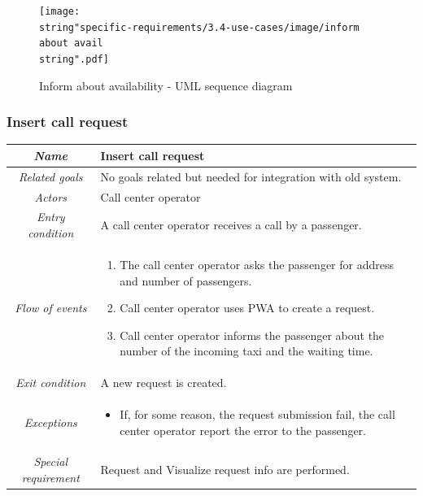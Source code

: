 \clearpage{}

\begin{landscape}

\begin{figure}[H]
\begin{centering}
\texttt{[image: \\string"specific-requirements/3.4-use-cases/image/inform about avail\\string".pdf]}
\par\end{centering}

\protect\caption{Inform about availability - UML sequence diagram}
\end{figure}


\end{landscape}

\clearpage{}


\subsubsection{Insert call request}

\begin{flushleft}
\begin{tabular}{c|>{\centering}p{10cm}}
\hline 
\emph{Name} & \raggedright{}Insert call request\tabularnewline
\hline 
\emph{Related goals} & \raggedright{}No goals related but needed for integration with old
system.\tabularnewline
\hline 
\emph{Actors} & \raggedright{}Call center operator\tabularnewline
\hline 
\emph{Entry condition} & \raggedright{}A call center operator receives a call by a passenger.\tabularnewline
\hline 
\emph{Flow of events} & \begin{enumerate}
\item \begin{raggedright}
The call center operator asks the passenger for address and number
of passengers.
\par\end{raggedright}
\item \begin{raggedright}
Call center operator uses PWA to create a request.
\par\end{raggedright}
\item \raggedright{}Call center operator informs the passenger about the
number of the incoming taxi and the waiting time.\end{enumerate}
\tabularnewline
\hline 
\emph{Exit condition} & \raggedright{}A new request is created.\tabularnewline
\hline 
\emph{Exceptions} & \begin{itemize}
\item \raggedright{}If, for some reason, the request submission fail, the
call center operator report the error to the passenger.\end{itemize}
\tabularnewline
\hline 
\emph{Special requirement} & \raggedright{}Request and Visualize request info are performed.\tabularnewline
\hline 
\end{tabular}
\par\end{flushleft}

